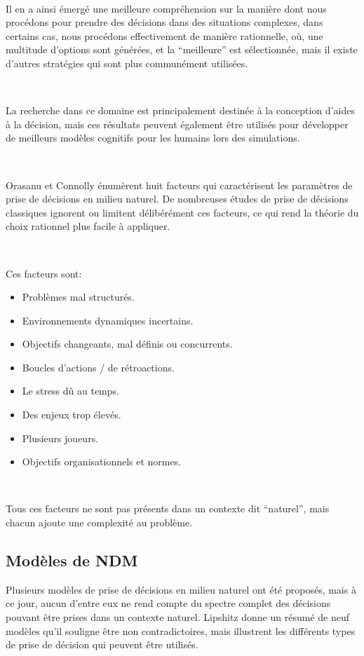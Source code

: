 ~\par
Il en a ainsi émergé une meilleure compréhension sur la manière dont nous procédons pour prendre des décisions dans des situations complexes, dans certains cas, nous procédons effectivement de manière rationnelle, où, une multitude d’options sont générées, et la “meilleure” est sélectionnée, mais il existe d’autres stratégies qui sont plus communément utilisées.

~\par
La recherche dans ce domaine est principalement destinée à la conception d’aides à la décision, mais ces résultats peuvent également être utilisés pour développer de meilleurs modèles cognitifs pour les humains lors des simulations.

~\par
Orasanu et Connolly \parencite{orasanu1993reinvention} énumèrent huit facteurs qui caractérisent les paramètres de prise de décisions en milieu naturel. De nombreuses études de prise de décisions classiques ignorent ou limitent délibérément ces facteurs, ce qui rend la théorie du choix rationnel plus facile à appliquer.

~\par

Ces facteurs sont:
\begin{itemize}
\item Problèmes mal structurés.
\item Environnements dynamiques incertains.
\item Objectifs changeants, mal définis ou concurrents.
\item Boucles d'actions / de rétroactions.
\item Le stress dû au temps.
\item Des enjeux trop élevés.
\item Plusieurs joueurs.
\item Objectifs organisationnels et normes.
\end{itemize}

~\par
Tous ces facteurs ne sont pas présents dans un contexte dit “naturel”, mais chacun ajoute une complexité au problème.


\subsection{Modèles de NDM}

Plusieurs modèles de prise de décisions en milieu naturel ont été proposés, mais à ce jour,
aucun d’entre eux ne rend compte du spectre complet des décisions pouvant être prises dans un contexte naturel. Lipshitz \parencite{lipshitz1993converging} donne un résumé de neuf modèles qu’il souligne être non contradictoires, mais illustrent les différents types de prise de décision qui peuvent être utilisés.

